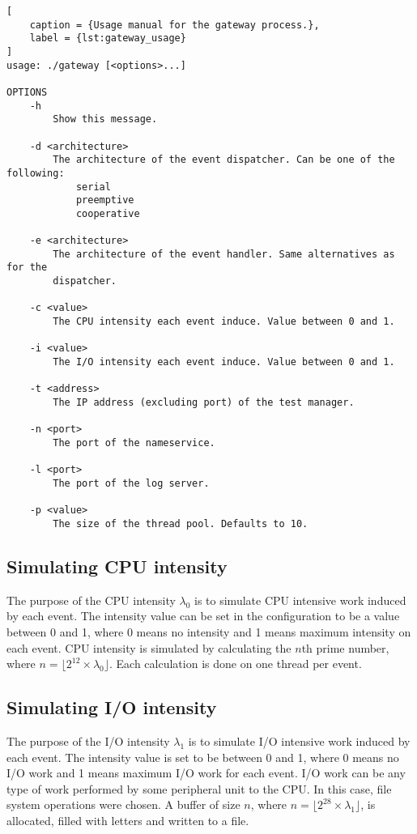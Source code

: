 \begin{lstlisting}[
    caption = {Usage manual for the gateway process.},
    label = {lst:gateway_usage}
]
usage: ./gateway [<options>...]

OPTIONS
    -h
        Show this message.

    -d <architecture>
        The architecture of the event dispatcher. Can be one of the following:
            serial
            preemptive
            cooperative

    -e <architecture>
        The architecture of the event handler. Same alternatives as for the
        dispatcher.

    -c <value>
        The CPU intensity each event induce. Value between 0 and 1.

    -i <value>
        The I/O intensity each event induce. Value between 0 and 1.

    -t <address>
        The IP address (excluding port) of the test manager.

    -n <port>
        The port of the nameservice.

    -l <port>
        The port of the log server.

    -p <value>
        The size of the thread pool. Defaults to 10.
\end{lstlisting}

\subsection{Simulating CPU intensity}

The purpose of the CPU intensity $\lambda_0$ is to simulate CPU intensive work
induced by each event. The intensity value can be set in the configuration to
be a value between 0 and 1, where 0 means no intensity and 1 means maximum
intensity on each event. CPU intensity is simulated by calculating the $n$th
prime number, where $n = \lfloor 2^{12} \times \lambda_0 \rfloor$. Each
calculation is done on one thread per event.

\subsection{Simulating I/O intensity}

The purpose of the I/O intensity $\lambda_1$ is to simulate I/O intensive work
induced by each event. The intensity value is set to be between 0 and 1, where
0 means no I/O work and 1 means maximum I/O work for each event. I/O work can
be any type of work performed by some peripheral unit to the CPU. In this case,
file system operations were chosen. A buffer of size $n$, where $n = \lfloor
2^{28} \times \lambda_1 \rfloor$, is allocated, filled with letters and written
to a file.

